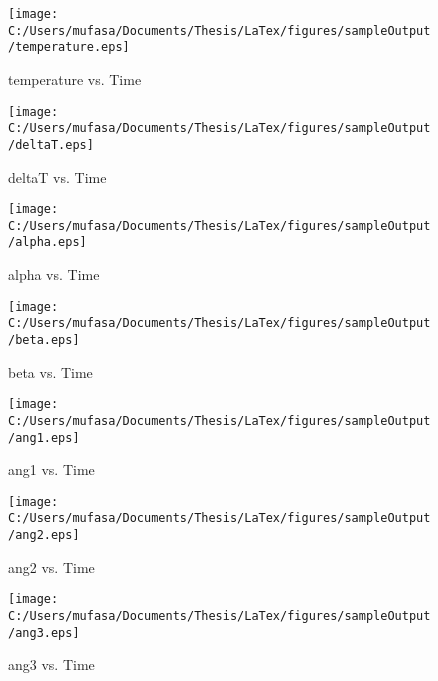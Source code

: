 \begin{figure}[]
	\centering
	\caption{temperature vs. Time}
		\texttt{[image: C:/Users/mufasa/Documents/Thesis/LaTex/figures/sampleOutput/temperature.eps]}
\end{figure}
\begin{figure}[]
	\centering
	\caption{deltaT vs. Time}
		\texttt{[image: C:/Users/mufasa/Documents/Thesis/LaTex/figures/sampleOutput/deltaT.eps]}
\end{figure}
\begin{figure}[]
	\centering
	\caption{alpha vs. Time}
		\texttt{[image: C:/Users/mufasa/Documents/Thesis/LaTex/figures/sampleOutput/alpha.eps]}
\end{figure}
\begin{figure}[]
	\centering
	\caption{beta vs. Time}
		\texttt{[image: C:/Users/mufasa/Documents/Thesis/LaTex/figures/sampleOutput/beta.eps]}
\end{figure}
\begin{figure}[]
	\centering
	\caption{ang1 vs. Time}
		\texttt{[image: C:/Users/mufasa/Documents/Thesis/LaTex/figures/sampleOutput/ang1.eps]}
\end{figure}
\begin{figure}[]
	\centering
	\caption{ang2 vs. Time}
		\texttt{[image: C:/Users/mufasa/Documents/Thesis/LaTex/figures/sampleOutput/ang2.eps]}
\end{figure}
\begin{figure}[]
	\centering
	\caption{ang3 vs. Time}
		\texttt{[image: C:/Users/mufasa/Documents/Thesis/LaTex/figures/sampleOutput/ang3.eps]}
\end{figure}
